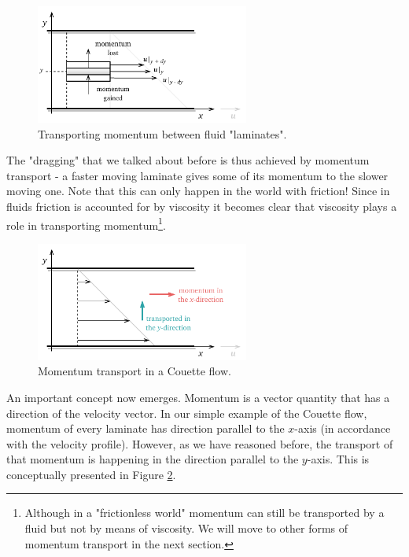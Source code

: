\documentclass[10pt,twocolumn]{article}
\begin{document}
\begin{figure}[H]
\centering\includegraphics[width=7cm]{momentum-transport-in-laminates.pdf}
\caption{Transporting momentum between fluid "laminates".}
\label{fig:momentum-transport-in-laminates}
\end{figure}
The "dragging" that we talked about before is thus achieved by momentum transport - a faster moving laminate gives some of its momentum to the slower moving one. Note that this can only happen in the world with friction! Since in fluids friction is accounted for by viscosity it becomes clear that viscosity plays a role in transporting momentum\footnote{Although in a "frictionless world" momentum can still be transported by a fluid but not by means of viscosity. We will move to other forms of momentum transport in the next section.}.
\begin{figure}[H]
\centering\includegraphics[width=7cm]{couette-flow-momentum-transport.pdf}
\caption{Momentum transport in a Couette flow.}
\label{fig:couette-flow-momentum-transport}
\end{figure}
An important concept now emerges. Momentum is a vector quantity that has a direction of the velocity vector. In our simple example of the Couette flow, momentum of every laminate has direction parallel to the $x$-axis (in accordance with the velocity profile). However, as we have reasoned before, the transport of that momentum is happening in the direction parallel to the $y$-axis. This is conceptually presented in Figure \ref{fig:couette-flow-momentum-transport}. 
\end{document}
